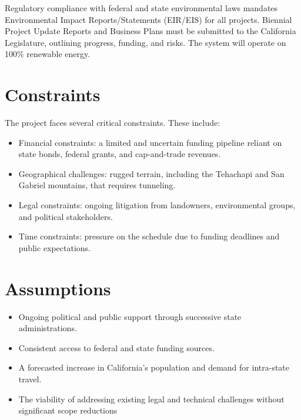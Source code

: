Regulatory compliance with federal and state environmental laws mandates Environmental Impact Reports/Statements (EIR/EIS) for all projects. Biennial Project Update Reports and Business Plans must be submitted to the California Legislature, outlining progress, funding, and risks. The system will operate on 100\% renewable energy.

\section{Constraints}
The project faces several critical constraints. These include:
\begin{itemize}
	\item Financial constraints: a limited and uncertain funding pipeline reliant on state bonds, federal grants, and cap-and-trade revenues.
	\item Geographical challenges: rugged terrain, including the Tehachapi and San Gabriel mountains, that requires tunneling.
	\item Legal constraints: ongoing litigation from landowners, environmental groups, and political stakeholders.
	\item Time constraints: pressure on the schedule due to funding deadlines and public expectations.
\end{itemize}

\section{Assumptions}
\begin{itemize}
	\item Ongoing political and public support through successive state administrations.
	\item Consistent access to federal and state funding sources.
	\item A forecasted increase in California’s population and demand for intra-state travel.
	\item The viability of addressing existing legal and technical challenges without significant scope reductions

\end{itemize}

